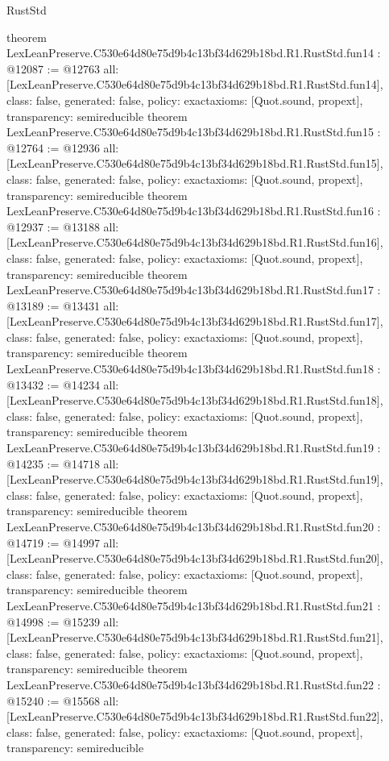 \begin{lexlean}{RustStd}
\begin{coremodule}
{}
theorem LexLeanPreserve.C530e64d80e75d9b4c13bf34d629b18bd.R1.RustStd.fun14 : @12087 := @12763 {
  all: [LexLeanPreserve.C530e64d80e75d9b4c13bf34d629b18bd.R1.RustStd.fun14],
  class: false,
  generated: false,
  policy: exact{axioms: [Quot.sound, propext]},
  transparency: semireducible
}
theorem LexLeanPreserve.C530e64d80e75d9b4c13bf34d629b18bd.R1.RustStd.fun15 : @12764 := @12936 {
  all: [LexLeanPreserve.C530e64d80e75d9b4c13bf34d629b18bd.R1.RustStd.fun15],
  class: false,
  generated: false,
  policy: exact{axioms: [Quot.sound, propext]},
  transparency: semireducible
}
theorem LexLeanPreserve.C530e64d80e75d9b4c13bf34d629b18bd.R1.RustStd.fun16 : @12937 := @13188 {
  all: [LexLeanPreserve.C530e64d80e75d9b4c13bf34d629b18bd.R1.RustStd.fun16],
  class: false,
  generated: false,
  policy: exact{axioms: [Quot.sound, propext]},
  transparency: semireducible
}
theorem LexLeanPreserve.C530e64d80e75d9b4c13bf34d629b18bd.R1.RustStd.fun17 : @13189 := @13431 {
  all: [LexLeanPreserve.C530e64d80e75d9b4c13bf34d629b18bd.R1.RustStd.fun17],
  class: false,
  generated: false,
  policy: exact{axioms: [Quot.sound, propext]},
  transparency: semireducible
}
theorem LexLeanPreserve.C530e64d80e75d9b4c13bf34d629b18bd.R1.RustStd.fun18 : @13432 := @14234 {
  all: [LexLeanPreserve.C530e64d80e75d9b4c13bf34d629b18bd.R1.RustStd.fun18],
  class: false,
  generated: false,
  policy: exact{axioms: [Quot.sound, propext]},
  transparency: semireducible
}
theorem LexLeanPreserve.C530e64d80e75d9b4c13bf34d629b18bd.R1.RustStd.fun19 : @14235 := @14718 {
  all: [LexLeanPreserve.C530e64d80e75d9b4c13bf34d629b18bd.R1.RustStd.fun19],
  class: false,
  generated: false,
  policy: exact{axioms: [Quot.sound, propext]},
  transparency: semireducible
}
theorem LexLeanPreserve.C530e64d80e75d9b4c13bf34d629b18bd.R1.RustStd.fun20 : @14719 := @14997 {
  all: [LexLeanPreserve.C530e64d80e75d9b4c13bf34d629b18bd.R1.RustStd.fun20],
  class: false,
  generated: false,
  policy: exact{axioms: [Quot.sound, propext]},
  transparency: semireducible
}
theorem LexLeanPreserve.C530e64d80e75d9b4c13bf34d629b18bd.R1.RustStd.fun21 : @14998 := @15239 {
  all: [LexLeanPreserve.C530e64d80e75d9b4c13bf34d629b18bd.R1.RustStd.fun21],
  class: false,
  generated: false,
  policy: exact{axioms: [Quot.sound, propext]},
  transparency: semireducible
}
theorem LexLeanPreserve.C530e64d80e75d9b4c13bf34d629b18bd.R1.RustStd.fun22 : @15240 := @15568 {
  all: [LexLeanPreserve.C530e64d80e75d9b4c13bf34d629b18bd.R1.RustStd.fun22],
  class: false,
  generated: false,
  policy: exact{axioms: [Quot.sound, propext]},
  transparency: semireducible
}
\end{coremodule}
\end{lexlean}
